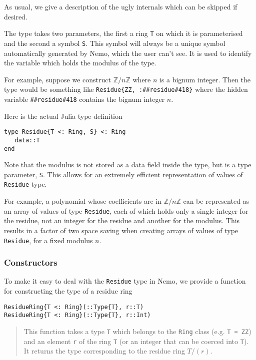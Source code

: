 \documentclass[a4paper,10pt]{article}
\newcommand{\Z}{\mathbb{Z}}
\newcommand{\code}{\lstinline}
\newcommand{\desc}[1]{\vspace{-3mm}\begin{quote}#1\end{quote}}
\begin{document}
{{{As usual, we give a description of the ugly internals which can be skipped if
desired.

The type takes two parameters, the first a ring \code{T} on which it is
parameterised and the second a symbol \code{S}. This symbol will always be
a unique symbol automatically generated by Nemo, which the user can't see. It
is used to identify the variable which holds the modulus of the type.

For example, suppose we construct $\Z/n\Z$ where $n$ is a bignum integer. Then
the type would be something like \code|Residue{ZZ, :##residue#418}| where the
hidden variable \code{##residue#418} contains the bignum integer $n$.

Here is the actual Julia type definition

\begin{lstlisting}
type Residue{T <: Ring, S} <: Ring
   data::T
end
\end{lstlisting}

Note that the modulus is not stored as a data field inside the type, but is
a type parameter, \code{S}. This allows for an extremely efficient 
representation of values of \code{Residue} type.

For example, a polynomial whose coefficients are in $\Z/n\Z$ can be 
represented as an array of values of type \code{Residue}, each of which holds
only a single integer for the residue, not an integer for the residue and
another for the modulus. This results in a factor of two space saving when
creating arrays of values of type \code{Residue}, for a fixed modulus $n$.

\subsubsection{Constructors}

To make it easy to deal with the \code{Residue} type in Nemo, we provide a
function for constructing the type of a residue ring

\begin{lstlisting}
ResidueRing{T <: Ring}(::Type{T}, r::T)
ResidueRing{T <: Ring}(::Type{T}, r::Int)
\end{lstlisting}

\desc{This function takes a type \code{T} which belongs to the \code{Ring}
class (e.g. \code{T = ZZ}) and an element \code{r} of the ring \code{T} (or
an integer that can be coerced into \code{T}). It returns the type 
corresponding to the residue ring $T/(r)$.}

}}}
\end{document}
